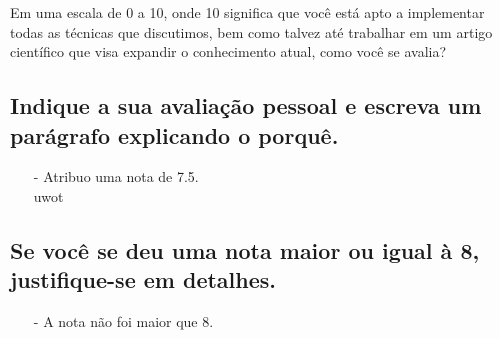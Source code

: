 \documentclass[paper=a4, fontsize=11pt]{scrartcl} %
\numberwithin{equation}{section} %
\numberwithin{figure}{section} %
\numberwithin{table}{section} %
\begin{document}
Em uma escala de 0 a 10, onde 10 significa que você está apto a implementar todas as técnicas que discutimos, bem como talvez até trabalhar em um artigo científico que visa expandir o conhecimento atual, como você se avalia?


\subsection{Indique a sua avaliação pessoal e escreva um parágrafo explicando o porquê.}

\begin{itemize}
    \item[-] Atribuo uma nota de 7.5.\\
    uwot
\end{itemize}

\subsection{Se você se deu uma nota maior ou igual à 8, justifique-se em detalhes.}

\begin{itemize}
    \item[-] A nota não foi maior que 8.
\end{itemize}
\end{document}
